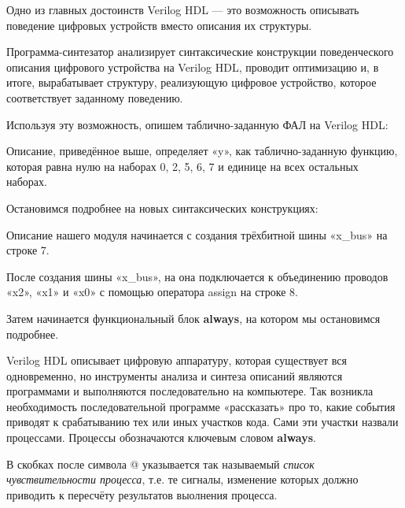 \documentclass[a5paper, DIV=14, headings=openany, twoside=true,fontsize=10pt, titlepage]{scrreprt}
\newcommand{\quotes}[1]{«#1»}
\newcommand{\eng}[1]{\foreignlanguage{english}{#1}}
\newcommand{\qeng}[1]{\quotes{\foreignlanguage{english}{#1}}}
\begin{document}
\par{Одно из главных достоинств \eng{Verilog HDL} — это возможность описывать поведение цифровых устройств вместо описания их структуры.}
 
\par{Программа-синтезатор анализирует синтаксические конструкции поведенческого описания цифрового устройства на \eng{Verilog HDL}, проводит оптимизацию и, в итоге, вырабатывает структуру, реализующую цифровое устройство, которое соответствует заданному поведению.}
 
\par{Используя эту возможность, опишем таблично-заданную ФАЛ на \eng{Verilog HDL}:}
 
\begin{minipage}{\linewidth}
  
\end{minipage}
 
  \par{Описание, приведённое выше, определяет \qeng{y}, как таблично-заданную функцию, которая равна нулю на наборах 0, 2, 5, 6, 7 и единице на всех остальных наборах.}
 
\par{Остановимся подробнее на новых синтаксических конструкциях:}
\par{Описание нашего модуля начинается с создания трёхбитной шины \qeng{x\_bus} на строке 7.}
\par{После создания шины \qeng{x\_bus}, на она подключается к объединению проводов \qeng{x2}, \qeng{x1} и \qeng{x0} с помощью оператора \eng{assign} на строке 8.}

 
\par{Затем начинается функциональный блок \eng{\textbf{always}}, на котором мы остановимся подробнее.}
\par{\eng{Verilog HDL} описывает цифровую аппаратуру, которая существует вся одновременно, но инструменты анализа и синтеза описаний являются программами и выполняются последовательно на компьютере. Так возникла необходимость последовательной программе «рассказать» про то, какие события приводят к срабатыванию тех или иных участков кода. Сами эти участки назвали процессами. Процессы обозначаются ключевым словом \eng{\textbf{always}}.}
 
\par{В скобках после символа @ указывается так называемый \emph{список чувствительности процесса}, т.е. те сигналы, изменение которых должно приводить к пересчёту результатов выолнения процесса.}
\end{document}
